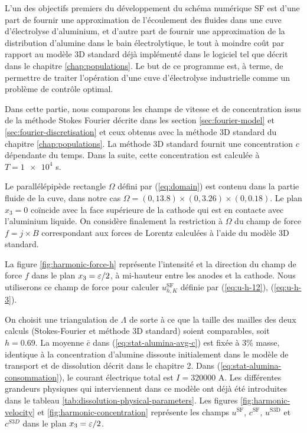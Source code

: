 \renewcommand{\floatpagefraction}{.9}%
\renewcommand{\topfraction}{0.9}

L'un des objectifs premiers du développement du schéma numérique
SF est d'une part de fournir une approximation de l'écoulement des
fluides dans une cuve d'électrolyse d'aluminium, et d'autre part
de fournir une approximation de la distribution d'alumine dans le bain
électrolytique, le tout à moindre coût par rapport au modèle
3D standard déjà implémenté dans le logiciel \citealucell{} tel que décrit
dans le chapitre \ref{chap:populations}. Le but de ce programme est,
à terme, de permettre de traiter l'opération d'une cuve
d'électrolyse industrielle comme un problème de contrôle optimal.

Dans cette partie, nous comparons les champs de vitesse et de
concentration issus de la méthode Stokes Fourier décrite dans les
section \ref{sec:fourier-model} et \ref{sec:fourier-discretisation} et
ceux obtenus avec la méthode 3D standard du chapitre
\ref{chap:populations}. La méthode 3D standard fournit une
concentration $c$ dépendante du temps. Dans la suite, cette
concentration est calculée à $T = \num{1e4}$ \si{\second}.

Le parallélépipède rectangle $\Omega$ défini par (\ref{eq:domain}) est
contenu dans la partie fluide de la cuve, dans notre cas $\Omega = (0,
\num{13.8})\times(0,\num{3.26})\times(0,\num{0.18})$. Le plan $x_3 =
0$ coïncide avec la face supérieure de la cathode qui est en contacte
avec l'aluminium liquide. On considère finalement la restriction à
$\Omega$ du champ de force $f = j\times B$ correspondant aux forces de
Lorentz calculées à l'aide du modèle 3D standard.

La figure \ref{fig:harmonic-force-h} représente l'intensité et la
direction du champ de force $f$ dans le plan $x_3 = \varepsilon / 2$,
à mi-hauteur entre les anodes et la cathode. Nous utiliserons ce champ
de force pour calculer $u_{h,K}^\mathrm{SF}$ définie par
(\ref{eq:u-h-12}), (\ref{eq:u-h-3}).

On choisit une triangulation de $\Lambda$ de sorte à ce que la taille
des mailles des deux calculs (Stokes-Fourier et méthode 3D standard)
soient comparables, soit $h = \num{0.69}$. La moyenne $\bar{c}$ dans
(\ref{eq:stat-alumina-avg-c}) est fixée à 3\% masse, identique à la
concentration d'alumine dissoute initialement dans le modèle de transport
et de dissolution décrit dans le chapitre 2. Dans
(\ref{eq:stat-alumina-consommation}), le courant électrique total est $I =
\num{320000}$ \si{\ampere}. Les différentes grandeurs physiques qui
interviennent dans ce modèle ont déjà été introduites dans le tableau
\ref{tab:dissolution-physical-parameters}. Les figures
\ref{fig:harmonic-velocity} et \ref{fig:harmonic-concentration}
représente les champs $u^{\mathrm{SF}}$, $c^\mathrm{SF}$,
$u^\mathrm{S3D}$ et $c^{S3D}$ dans le plan $x_3 = \varepsilon / 2$.


